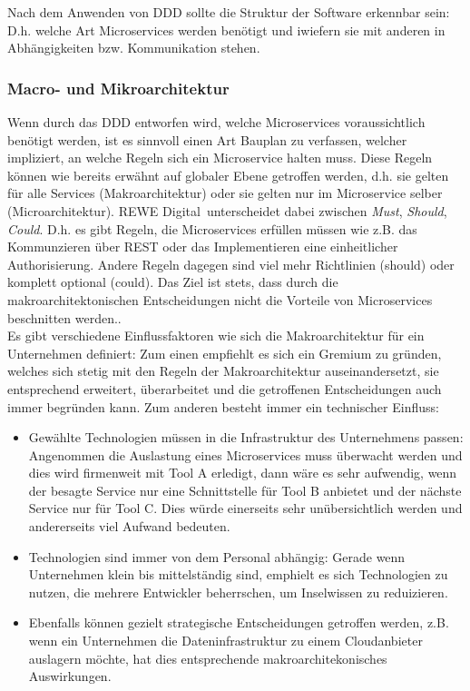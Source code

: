 Nach dem Anwenden von DDD sollte die Struktur der Software erkennbar sein: D.h. welche Art Microservices werden benötigt und iwiefern sie mit anderen in Abhängigkeiten bzw. Kommunikation stehen.   

\subsubsection{Macro- und Mikroarchitektur}

Wenn durch das DDD entworfen wird, welche Microservices voraussichtlich benötigt werden, ist es sinnvoll einen Art Bauplan zu verfassen, welcher impliziert, an welche Regeln sich ein Microservice halten muss. Diese Regeln können wie bereits erwähnt auf globaler Ebene getroffen werden, d.h. sie gelten für alle Services (Makroarchitektur) oder sie gelten nur im Microservice selber (Microarchitektur). REWE Digital unterscheidet dabei zwischen \textit{Must}, \textit{Should}, \textit{Could}. D.h. es gibt Regeln, die Microservices erfüllen müssen wie z.B. das Kommunzieren über REST oder das Implementieren eine einheitlicher Authorisierung.\cite{rewe2019mic_ppp} Andere Regeln dagegen sind viel mehr Richtlinien (should) oder komplett optional (could). Das Ziel ist stets, dass durch die makroarchitektonischen Entscheidungen nicht die Vorteile von Microservices beschnitten werden.\cite{wolff2018mic_praxis}\cite{irakli2016mic_arc}. \\

Es gibt verschiedene Einflussfaktoren wie sich die Makroarchitektur für ein Unternehmen definiert: Zum einen empfiehlt es sich ein Gremium zu gründen, welches sich stetig mit den Regeln der Makroarchitektur auseinandersetzt, sie entsprechend erweitert, überarbeitet und die getroffenen Entscheidungen auch immer begründen kann.\cite{wolff2018mic_praxis} Zum anderen besteht immer ein technischer Einfluss\cite{wolff2018mic_praxis}:
\begin{itemize}
	\item Gewählte Technologien müssen in die Infrastruktur des Unternehmens passen: Angenommen die Auslastung eines Microservices muss überwacht werden und dies wird firmenweit mit Tool A erledigt, dann wäre es sehr aufwendig, wenn der besagte Service nur eine Schnittstelle für Tool B anbietet und der nächste Service nur für Tool C. Dies würde einerseits sehr unübersichtlich werden und andererseits viel Aufwand bedeuten. 
	\item Technologien sind immer von dem Personal abhängig: Gerade wenn Unternehmen klein bis mittelständig sind, emphielt es sich Technologien zu nutzen, die mehrere Entwickler beherrschen, um Inselwissen zu reduizieren. 
	\item Ebenfalls können gezielt strategische Entscheidungen getroffen werden, z.B. wenn ein Unternehmen die Dateninfrastruktur zu einem Cloudanbieter auslagern möchte, hat dies entsprechende makroarchitekonisches Auswirkungen.
\end{itemize}

